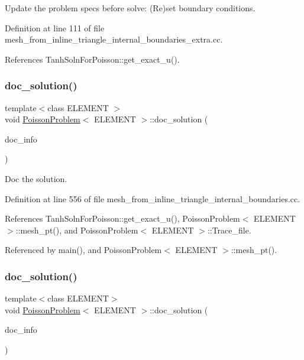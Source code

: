 Update the problem specs before solve\+: (Re)set boundary conditions. 



Definition at line 111 of file mesh\+\_\+from\+\_\+inline\+\_\+triangle\+\_\+internal\+\_\+boundaries\+\_\+extra.\+cc.



References Tanh\+Soln\+For\+Poisson\+::get\+\_\+exact\+\_\+u().

\mbox{\label{classPoissonProblem_aab6f503fa242f687bb8452527bb7688f}} 
\subsubsection{\texorpdfstring{doc\+\_\+solution()}{doc\_solution()}\hspace{0.1cm}{\footnotesize\ttfamily [1/2]}}
{\footnotesize\ttfamily template$<$class E\+L\+E\+M\+E\+NT $>$ \\
void \hyperlink{classPoissonProblem}{Poisson\+Problem}$<$ E\+L\+E\+M\+E\+NT $>$\+::doc\+\_\+solution (\begin{DoxyParamCaption}\item[{Doc\+Info \&}]{doc\+\_\+info }\end{DoxyParamCaption})}



Doc the solution. 



Definition at line 556 of file mesh\+\_\+from\+\_\+inline\+\_\+triangle\+\_\+internal\+\_\+boundaries.\+cc.



References Tanh\+Soln\+For\+Poisson\+::get\+\_\+exact\+\_\+u(), Poisson\+Problem$<$ E\+L\+E\+M\+E\+N\+T $>$\+::mesh\+\_\+pt(), and Poisson\+Problem$<$ E\+L\+E\+M\+E\+N\+T $>$\+::\+Trace\+\_\+file.



Referenced by main(), and Poisson\+Problem$<$ E\+L\+E\+M\+E\+N\+T $>$\+::mesh\+\_\+pt().

\mbox{\label{classPoissonProblem_aab6f503fa242f687bb8452527bb7688f}} 
\subsubsection{\texorpdfstring{doc\+\_\+solution()}{doc\_solution()}\hspace{0.1cm}{\footnotesize\ttfamily [2/2]}}
{\footnotesize\ttfamily template$<$class E\+L\+E\+M\+E\+NT$>$ \\
void \hyperlink{classPoissonProblem}{Poisson\+Problem}$<$ E\+L\+E\+M\+E\+NT $>$\+::doc\+\_\+solution (\begin{DoxyParamCaption}\item[{Doc\+Info \&}]{doc\+\_\+info }\end{DoxyParamCaption})}



